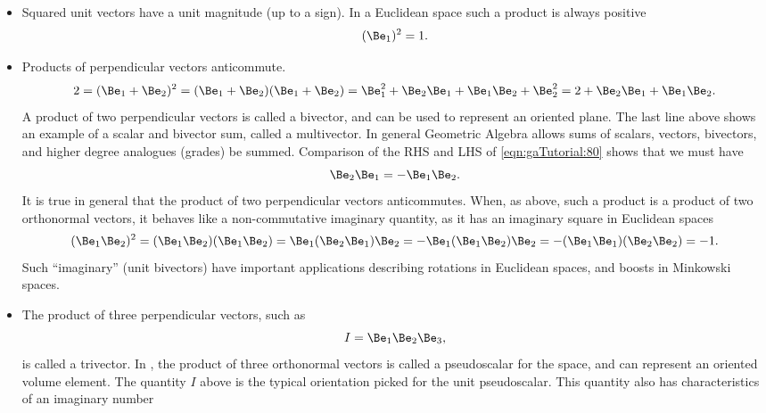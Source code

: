 \begin{itemize}
\item Squared unit vectors have a unit magnitude (up to a sign).  In a Euclidean space such a product is always positive
%
\begin{dmath}\label{eqn:gaTutorial:60}
(\Be_1)^2 = 1.
\end{dmath}
%
\item Products of perpendicular vectors anticommute.
%
\begin{dmath}\label{eqn:gaTutorial:80}
2
=
(\Be_1 + \Be_2)^2
= (\Be_1 + \Be_2)(\Be_1 + \Be_2)
= \Be_1^2 + \Be_2 \Be_1 + \Be_1 \Be_2 + \Be_2^2
= 2 + \Be_2 \Be_1 + \Be_1 \Be_2.
\end{dmath}
%
A product of two perpendicular vectors is called a bivector, and can be used to represent an oriented plane.  The last line above shows an example of a scalar and bivector sum, called a multivector.  In general Geometric Algebra allows sums of scalars, vectors, bivectors, and higher degree analogues (grades) be summed.
%
Comparison of the RHS and LHS of \cref{eqn:gaTutorial:80} shows that we must have
%
\begin{dmath}\label{eqn:gaTutorial:100}
\Be_2 \Be_1 = -\Be_1 \Be_2.
\end{dmath}
%
It is true in general that the product of two perpendicular vectors anticommutes.  When, as above, such a product is a product of
two orthonormal vectors, it behaves like a non-commutative imaginary quantity, as it has an imaginary square in Euclidean spaces
%
\begin{dmath}\label{eqn:gaTutorial:120}
(\Be_1 \Be_2)^2
=
(\Be_1 \Be_2)
(\Be_1 \Be_2)
=
\Be_1 (\Be_2
\Be_1) \Be_2
=
-\Be_1 (\Be_1
\Be_2) \Be_2
=
-(\Be_1 \Be_1)
(\Be_2 \Be_2)
=-1.
\end{dmath}
%
Such ``imaginary'' (unit bivectors) have important applications describing rotations in Euclidean spaces, and boosts in Minkowski spaces.
%
\item
The product of three perpendicular vectors, such as
%
\begin{dmath}\label{eqn:gaTutorial:140}
I = \Be_1 \Be_2 \Be_3,
\end{dmath}
%
is called a trivector.  In , the product of three orthonormal vectors is called a pseudoscalar for the space, and can represent an oriented volume element.  The quantity \( I \) above is the typical orientation picked for the  unit pseudoscalar.  This quantity also has characteristics of an imaginary number
%
\begin{dmath}\label{eqn:gaTutorial:160}

\end{dmath}
\end{itemize}
